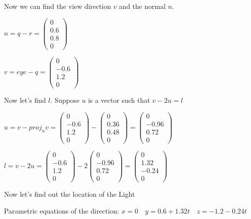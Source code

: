 \documentclass[12pt]{article}
\begin{document}
Now we can find the view direction $v$ and the normal $n$.

$n = q-r = \begin{pmatrix}0 \\0.6\\0.8\\0\end{pmatrix}$

$v = eye - q = \begin{pmatrix}0 \\-0.6\\1.2\\0\end{pmatrix}$

Now let's find $l$. Suppose $u$ is a vector such that $v - 2u = l$

$u = v - proj_n v = \begin{pmatrix}0 \\-0.6\\1.2\\0\end{pmatrix}- \begin{pmatrix}0\\0.36\\0.48\\0\end{pmatrix} =\begin{pmatrix}0\\-0.96\\0.72\\0\end{pmatrix}$


$l = v-2u=\begin{pmatrix}0 \\-0.6\\1.2\\0\end{pmatrix}-2\begin{pmatrix}0 \\-0.96\\0.72\\0\end{pmatrix}=\begin{pmatrix}0 \\1.32\\-0.24\\0\end{pmatrix}$

Now let's find out the location of the Light

Parametric equations of the direction: $x=0 \quad y=0.6+1.32t \quad z=-1.2-0.24t$
\end{document}
